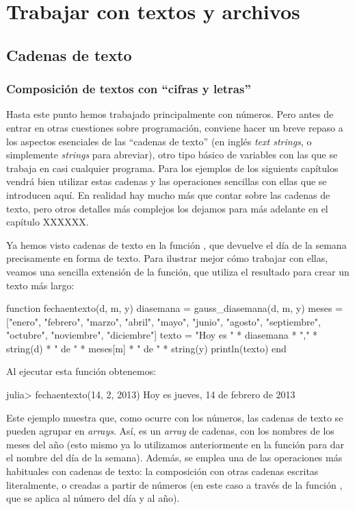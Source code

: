 \chapter{Trabajar con textos y archivos}

\section{Cadenas de texto}

\subsection{Composición de textos con ``cifras y letras''}

Hasta este punto hemos trabajado principalmente con números. Pero antes de entrar en otras cuestiones sobre programación, conviene hacer un breve repaso a los aspectos esenciales de las ``cadenas de texto'' (en inglés \emph{text strings}, o simplemente \emph{strings} para abreviar), otro tipo básico de variables con las que se trabaja en casi cualquier programa. Para los ejemplos de los siguients capítulos vendrá bien utilizar estas cadenas y las operaciones sencillas con ellas que se introducen aquí. En realidad hay mucho más que contar sobre las cadenas de texto, pero otros detalles más complejos los dejamos para más adelante en el capítulo XXXXXX.

Ya hemos visto cadenas de texto en la función , que devuelve el día de la semana precisamente en forma de texto. Para ilustrar mejor cómo trabajar con ellas, veamos una sencilla extensión de la función, que utiliza el resultado para crear un texto más largo:

\begin{juliacode}
function fechaentexto(d, m, y)
  diasemana = gauss_diasemana(d, m, y)
  meses = ["enero", "febrero", "marzo", "abril", "mayo", "junio",
    "agosto", "septiembre", "octubre", "noviembre", "diciembre"]
  texto = "Hoy es " * diasemana * "," * 
    string(d) * " de " * meses[m] * " de " * string(y)
  println(texto)
end
\end{juliacode}

Al ejecutar esta función obtenemos:

\begin{jlconcode}
julia> fechaentexto(14, 2, 2013)
Hoy es jueves, 14 de febrero de 2013
\end{jlconcode}

Este ejemplo muestra que, como ocurre con los números, las cadenas de texto se pueden agrupar en \emph{arrays}. Así,  es un \emph{array} de cadenas, con los nombres de los meses del año (esto mismo ya lo utilizamos anteriormente en la función  para dar el nombre del día de la semana). Además, se emplea una de las operaciones más habituales con cadenas de texto: la composición con otras cadenas escritas literalmente, o creadas a partir de números (en este caso a través de la función , que se aplica al número del día y al año).

